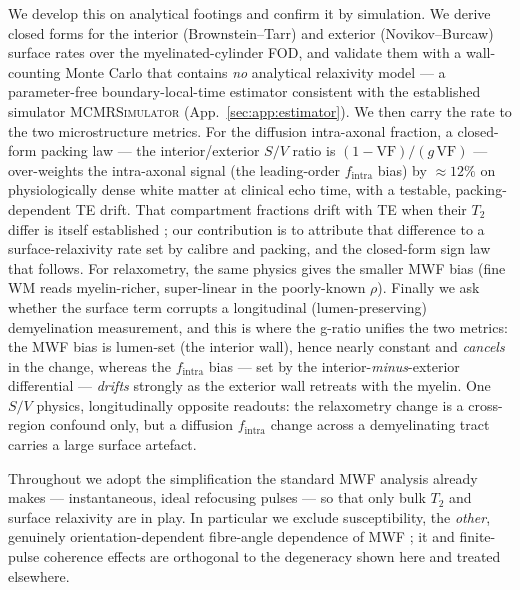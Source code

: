 We develop this on analytical footings and confirm it by simulation. We derive closed forms
for the interior (Brownstein--Tarr) and exterior (Novikov--Burcaw) surface rates over the
myelinated-cylinder FOD, and validate them with a wall-counting Monte Carlo that contains
\emph{no} analytical relaxivity model --- a parameter-free boundary-local-time estimator
consistent with the established simulator \textsc{MCMRSimulator} \citep{Cottaar2025}
(App.~\ref{sec:app:estimator}). We then carry the rate to the two microstructure metrics. For
the diffusion intra-axonal fraction, a closed-form packing law --- the interior/exterior $S/V$
ratio is $(1-\mathrm{VF})/(g\,\mathrm{VF})$ --- over-weights the intra-axonal signal (the
leading-order $f_{\mathrm{intra}}$ bias) by ${\approx}12\%$ on physiologically dense white
matter at clinical echo time, with a testable, packing-dependent TE drift. That compartment
fractions drift with TE when their $T_2$ differ is itself established \citep{Veraart2018}; our
contribution is to attribute that difference to a surface-relaxivity rate set by calibre and
packing, and the closed-form sign law that follows. For relaxometry, the same physics gives the
smaller MWF bias (fine WM reads myelin-richer, super-linear in the poorly-known $\rho$). Finally we ask whether the surface
term corrupts a longitudinal (lumen-preserving) demyelination measurement, and this is where the
g-ratio unifies the two metrics: the MWF bias is lumen-set (the interior wall), hence nearly
constant and \emph{cancels} in the change, whereas the $f_{\mathrm{intra}}$ bias --- set by the
interior-\emph{minus}-exterior differential --- \emph{drifts} strongly as the exterior wall
retreats with the myelin. One $S/V$ physics, longitudinally opposite readouts: the relaxometry
change is a cross-region confound only, but a diffusion $f_{\mathrm{intra}}$ change across a
demyelinating tract carries a large surface artefact.

Throughout we adopt the simplification the standard MWF analysis already makes ---
instantaneous, ideal refocusing pulses --- so that only bulk $T_2$ and surface
relaxivity are in play. In particular we exclude susceptibility, the \emph{other},
genuinely orientation-dependent fibre-angle dependence of MWF \citep{Birkl2021}; it and
finite-pulse coherence effects are orthogonal to the degeneracy shown here and treated
elsewhere.
